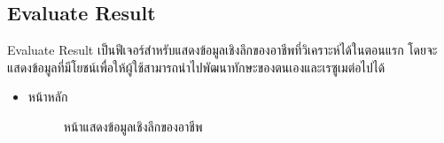 \subsection {Evaluate Result}
Evaluate Result เป็นฟีเจอร์สำหรับแสดงข้อมูลเชิงลึกของอาชีพที่วิเคราะห์ได้ในตอนแรก โดยจะแสดงข้อมูลที่มีโยชน์เพื่อให้ผู้ใช้สามารถนำไปพัฒนาทักษะของตนเองและเรซูเมต่อไปได้
\begin{itemize}
    \item หน้าหลัก
          \begin{figure}[H]\centering
              \setlength{\fboxrule}{0.2mm} %
              \setlength{\fboxsep}{0.5cm}
              \caption{\centering หน้าแสดงข้อมูลเชิงลึกของอาชีพ}\label{fig:wireframe3_1}
          \end{figure}
\end{itemize}

